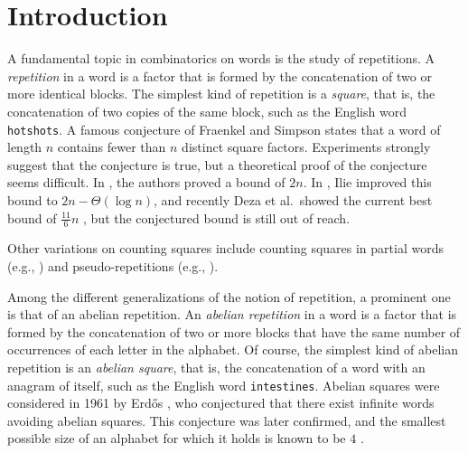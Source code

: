 \documentclass[11pt,reqno]{amsart}
\numberwithin{equation}{section}
\theoremstyle{plain}
\theoremstyle{definition}
\theoremstyle{remark}
\begin{document}
\maketitle


\section{Introduction}

A fundamental topic in combinatorics on words is the study of repetitions. A {\it repetition} in a word is a factor that is formed by the concatenation of two or more identical blocks. The simplest kind of repetition is a {\it square},
that is, the concatenation of two copies of the same block, such as 
the English word {\tt hotshots}.  A famous  conjecture of Fraenkel and Simpson \cite{FS98}  states that a word of length $n$ contains fewer than $n$  distinct square factors. Experiments strongly suggest that the conjecture is true, but a theoretical proof of the conjecture seems difficult. In \cite{FS98}, the authors proved a bound of $2n$. In \cite{I07}, Ilie improved this bound to $2n-\Theta(\log n)$, and recently Deza et al.~showed the current best bound of $\frac{11}{6}n$ \cite{DeFrTh15}, but the conjectured bound is still out of reach.

Other variations on counting squares include counting squares in
partial words (e.g., \cite{BSMS09}) and pseudo-repetitions
(e.g., \cite{GMMNT13}).

Among the different generalizations of the notion of repetition, a prominent one is that of an abelian repetition. An {\it abelian repetition} in a word is a factor that is formed by the concatenation of two or more blocks that have the same number of occurrences of each letter in the alphabet. Of course, the simplest kind of abelian repetition is an \emph{abelian square}, that is, the concatenation of a word with an anagram of itself, such as the English word
{\tt intestines}.
Abelian squares were considered in 1961 by Erd\H{o}s \cite{Erdos61},
who conjectured that there exist infinite words avoiding abelian squares.
This conjecture was later confirmed,
and the smallest possible size of an alphabet for 
which it holds is known to be $4$ \cite{Ker92}.
\end{document}
